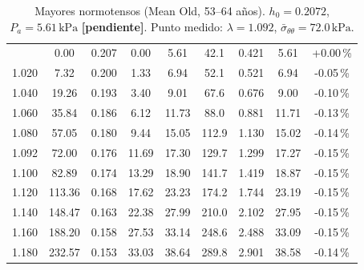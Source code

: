 \documentclass[11pt]{article}
\newcommand{\kPa}{\,\mathrm{kPa}}
\newcommand{\sbar}{\bar\sigma_{\theta\theta}}
\newcommand{\pend}{\textcolor{red!70!black}{\textbf{[pendiente]}}}
\begin{document}
\begin{table}[H]\centering\footnotesize\setlength{\tabcolsep}{3pt}
\caption{Mayores normotensos (Mean Old, 53--64 años). $h_0=0.2072$, $P_a=5.61\kPa$ \pend. Punto medido: $\lambda=1.092$, $\sbar=72.0\kPa$.}
\begin{tabular}{ccccccccc}\toprule\tablehead1.000 & 0.00 & 0.207 & 0.00 & 5.61 & 42.1 & 0.421 & 5.61 & +0.00\,\% \\
1.020 & 7.32 & 0.200 & 1.33 & 6.94 & 52.1 & 0.521 & 6.94 & -0.05\,\% \\
1.040 & 19.26 & 0.193 & 3.40 & 9.01 & 67.6 & 0.676 & 9.00 & -0.10\,\% \\
1.060 & 35.84 & 0.186 & 6.12 & 11.73 & 88.0 & 0.881 & 11.71 & -0.13\,\% \\
1.080 & 57.05 & 0.180 & 9.44 & 15.05 & 112.9 & 1.130 & 15.02 & -0.14\,\% \\
1.092 & 72.00 & 0.176 & 11.69 & 17.30 & 129.7 & 1.299 & 17.27 & -0.15\,\% \\
1.100 & 82.89 & 0.174 & 13.29 & 18.90 & 141.7 & 1.419 & 18.87 & -0.15\,\% \\
1.120 & 113.36 & 0.168 & 17.62 & 23.23 & 174.2 & 1.744 & 23.19 & -0.15\,\% \\
1.140 & 148.47 & 0.163 & 22.38 & 27.99 & 210.0 & 2.102 & 27.95 & -0.15\,\% \\
1.160 & 188.20 & 0.158 & 27.53 & 33.14 & 248.6 & 2.488 & 33.09 & -0.15\,\% \\
1.180 & 232.57 & 0.153 & 33.03 & 38.64 & 289.8 & 2.901 & 38.58 & -0.14\,\% \\
\bottomrule\end{tabular}\end{table}
\end{document}
